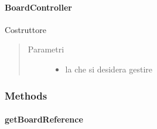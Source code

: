 \documentclass[letterpaper,10pt,italian]{sphinxmanual}
\begin{document}
\paragraph{BoardController}
\label{\detokenize{source/it/unicam/cs/pa/mastermind/gamecore/BoardController:id1}}

\begin{fulllineitems}
\label{\detokenize{source/it/unicam/cs/pa/mastermind/gamecore/BoardController:it.unicam.cs.pa.mastermind.gamecore.BoardController.BoardController(BoardModel)}}
Costruttore
\begin{quote}\begin{description}
\item[{Parametri}] \leavevmode\begin{itemize}
\item {} 
 \textendash{} la  che si desidera gestire

\end{itemize}

\end{description}\end{quote}

\end{fulllineitems}



\subsubsection{Methods}
\label{\detokenize{source/it/unicam/cs/pa/mastermind/gamecore/BoardController:methods}}

\paragraph{getBoardReference}
\label{\detokenize{source/it/unicam/cs/pa/mastermind/gamecore/BoardController:getboardreference}}
\end{document}
